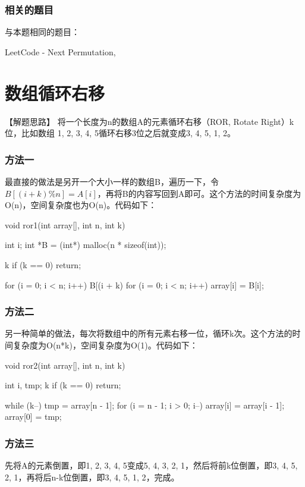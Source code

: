 \subsubsection{相关的题目}
与本题相同的题目：
\begindot
\item LeetCode -  Next Permutation, 
\myenddot


\section{数组循环右移} %

【解题思路】
将一个长度为n的数组A的元素循环右移（ROR, Rotate Right）k位，比如数组 {1, 2, 3, 4, 5}循环右移3位之后就变成{3, 4, 5, 1, 2}。

\subsubsection{方法一}
最直接的做法是另开一个大小一样的数组B，遍历一下，令$B[(i + k) \% n] = A[i]$，再将B的内容写回到A即可。这个方法的时间复杂度为O(n)，空间复杂度也为O(n)。代码如下：

\begin{Codex}[label=ror.c]
void ror1(int array[], int n, int k) {
    int i;
    int *B = (int*) malloc(n * sizeof(int));

    k %
    if (k == 0)
        return;

    for (i = 0; i < n; i++) {
        B[(i + k) %
    }
    for (i = 0; i < n; i++) {
        array[i] = B[i];
    }
}
\end{Codex}

\subsubsection{方法二}
另一种简单的做法，每次将数组中的所有元素右移一位，循环k次。这个方法的时间复杂度为O(n*k)，空间复杂度为O(1)。代码如下：

\begin{Codex}[label=ror.c]
void ror2(int array[], int n, int k) {
    int i, tmp;
    k %
    if (k == 0)
        return;

    while (k--) {
        tmp = array[n - 1];
        for (i = n - 1; i > 0; i--) {
            array[i] = array[i - 1];
        }
        array[0] = tmp;
    }
}
\end{Codex}

\subsubsection{方法三}
先将A的元素倒置，即{1, 2, 3, 4, 5}变成{5, 4, 3, 2, 1}，然后将前k位倒置，即{3, 4, 5, 2, 1}，再将后n-k位倒置，即{3, 4, 5, 1, 2}，完成。

